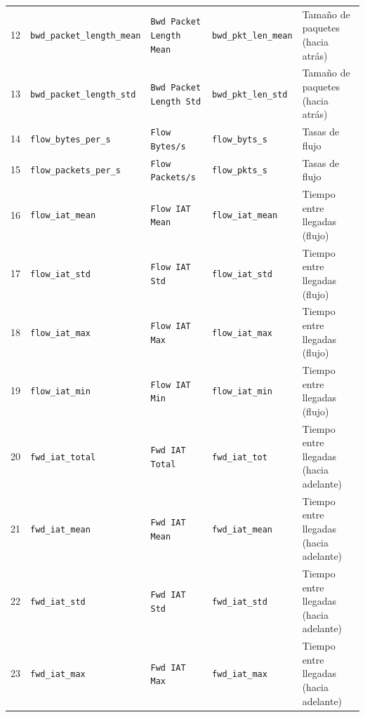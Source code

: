 \begin{landscape}
\begin{longtable}{@{}r p{4.2cm} p{4.4cm} p{4.1cm} p{4.8cm}@{}}
12 & \texttt{bwd\_\allowbreak{}packet\_\allowbreak{}length\_\allowbreak{}mean} & \texttt{Bwd Packet Length Mean} & \texttt{bwd\_\allowbreak{}pkt\_\allowbreak{}len\_\allowbreak{}mean} & Tamaño de paquetes (hacia atrás) \\
13 & \texttt{bwd\_\allowbreak{}packet\_\allowbreak{}length\_\allowbreak{}std} & \texttt{Bwd Packet Length Std} & \texttt{bwd\_\allowbreak{}pkt\_\allowbreak{}len\_\allowbreak{}std} & Tamaño de paquetes (hacia atrás) \\
14 & \texttt{flow\_\allowbreak{}bytes\_\allowbreak{}per\_\allowbreak{}s} & \texttt{Flow Bytes/s} & \texttt{flow\_\allowbreak{}byts\_\allowbreak{}s} & Tasas de flujo \\
15 & \texttt{flow\_\allowbreak{}packets\_\allowbreak{}per\_\allowbreak{}s} & \texttt{Flow Packets/s} & \texttt{flow\_\allowbreak{}pkts\_\allowbreak{}s} & Tasas de flujo \\
16 & \texttt{flow\_\allowbreak{}iat\_\allowbreak{}mean} & \texttt{Flow IAT Mean} & \texttt{flow\_\allowbreak{}iat\_\allowbreak{}mean} & Tiempo entre llegadas (flujo) \\
17 & \texttt{flow\_\allowbreak{}iat\_\allowbreak{}std} & \texttt{Flow IAT Std} & \texttt{flow\_\allowbreak{}iat\_\allowbreak{}std} & Tiempo entre llegadas (flujo) \\
18 & \texttt{flow\_\allowbreak{}iat\_\allowbreak{}max} & \texttt{Flow IAT Max} & \texttt{flow\_\allowbreak{}iat\_\allowbreak{}max} & Tiempo entre llegadas (flujo) \\
19 & \texttt{flow\_\allowbreak{}iat\_\allowbreak{}min} & \texttt{Flow IAT Min} & \texttt{flow\_\allowbreak{}iat\_\allowbreak{}min} & Tiempo entre llegadas (flujo) \\
20 & \texttt{fwd\_\allowbreak{}iat\_\allowbreak{}total} & \texttt{Fwd IAT Total} & \texttt{fwd\_\allowbreak{}iat\_\allowbreak{}tot} & Tiempo entre llegadas (hacia adelante) \\
21 & \texttt{fwd\_\allowbreak{}iat\_\allowbreak{}mean} & \texttt{Fwd IAT Mean} & \texttt{fwd\_\allowbreak{}iat\_\allowbreak{}mean} & Tiempo entre llegadas (hacia adelante) \\
22 & \texttt{fwd\_\allowbreak{}iat\_\allowbreak{}std} & \texttt{Fwd IAT Std} & \texttt{fwd\_\allowbreak{}iat\_\allowbreak{}std} & Tiempo entre llegadas (hacia adelante) \\
23 & \texttt{fwd\_\allowbreak{}iat\_\allowbreak{}max} & \texttt{Fwd IAT Max} & \texttt{fwd\_\allowbreak{}iat\_\allowbreak{}max} & Tiempo entre llegadas (hacia adelante) \\

\end{longtable}
\end{landscape}
